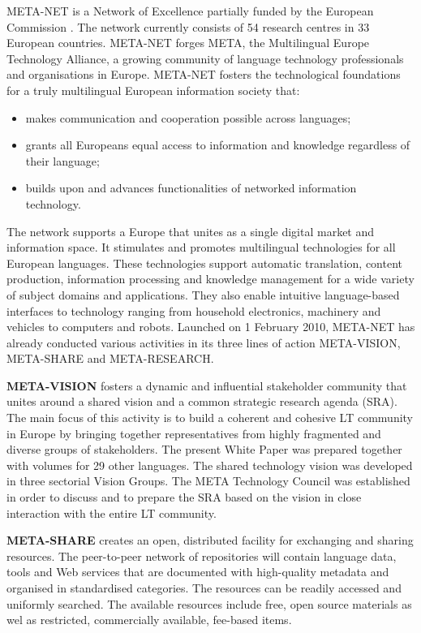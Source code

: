 \begin{multicols}{2}

META-NET is a Network of Excellence partially funded by the European Commission \cite{rehm2011}. The network currently consists of 54 research centres in 33 European countries. META-NET forges META, the Multilingual Europe Technology Alliance, a growing community of language technology professionals and organisations in Europe. META-NET fosters the technological foundations for a truly multilingual European information society that:

\begin{itemize}
\item makes communication and cooperation possible across languages;
\item grants all Europeans equal access to information and knowledge regardless of their language;
\item builds upon and advances functionalities of networked information technology.
\end{itemize}

The network supports a Europe that unites as a single digital market and information space. It stimulates and promotes multilingual technologies for all European languages. These technologies support automatic translation, content production, information processing and knowledge management for a wide variety of subject domains and applications. They also enable intuitive language-based interfaces to technology ranging from household electronics, machinery and vehicles to computers and robots.
Launched on 1 February 2010, META-NET has already conducted various activities in its three lines of action META-VISION, META-SHARE and META-RESEARCH.

\textbf{META-VISION} fosters a dynamic and influential stakeholder community that unites around a shared vision and a common strategic research agenda (SRA). The main focus of this activity is to build a coherent and cohesive LT community in Europe by bringing together representatives from highly fragmented and diverse groups of stakeholders. The present White Paper was prepared together with volumes for 29 other languages. The shared technology vision was developed in three sectorial Vision Groups. The META Technology Council was established in order to discuss and to prepare the SRA based on the vision in close interaction with the entire LT community.

\textbf{META-SHARE} creates an open, distributed facility for exchanging and sharing resources. The peer-to-peer network of repositories will contain language data, tools and Web services that are documented with high-quality metadata and organised in standardised categories. The resources can be readily accessed and uniformly searched. The available resources include free, open source materials as wel as restricted, commercially available, fee-based items.


\end{multicols}
